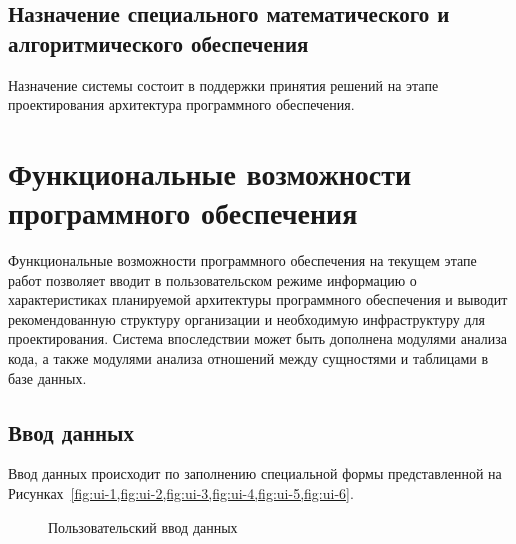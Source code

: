 \subsection{Назначение специального математического и алгоритмического обеспечения}\label{subsec:ch3/sec2/sub1}
Назначение системы состоит в поддержки принятия решений на этапе проектирования архитектура программного обеспечения.

\section{Функциональные возможности программного обеспечения}\label{sec:ch3/sec3}

Функциональные возможности программного обеспечения на текущем этапе работ позволяет вводит в пользовательском режиме информацию о характеристиках планируемой архитектуры программного обеспечения и выводит рекомендованную структуру организации и необходимую инфраструктуру для проектирования. Система впоследствии может быть дополнена модулями анализа кода, а также модулями анализа отношений между сущностями и таблицами в базе данных.

\subsection{Ввод данных}\label{subsec:ch3/sec3/sub1}
Ввод данных происходит по заполнению специальной формы представленной на Рисунках~\cref{fig:ui-1,fig:ui-2,fig:ui-3,fig:ui-4,fig:ui-5,fig:ui-6}. 
\begin{figure}[ht]
    \caption{Пользовательский ввод данных}\label{fig:ui-1}
\end{figure}

